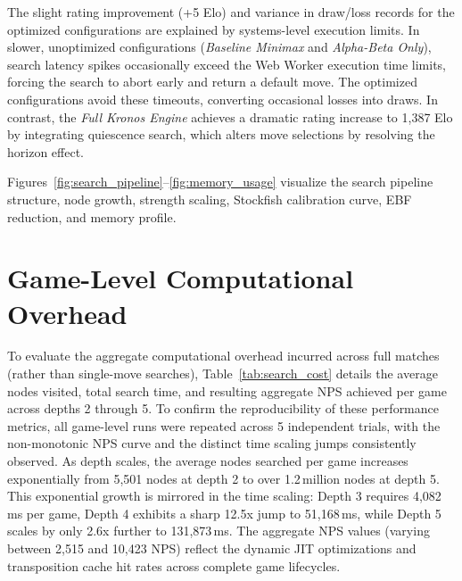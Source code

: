 The slight rating improvement (+5 Elo) and variance in draw/loss records for the optimized configurations are explained by systems-level execution limits. In slower, unoptimized configurations (\textit{Baseline Minimax} and \textit{Alpha-Beta Only}), search latency spikes occasionally exceed the Web Worker execution time limits, forcing the search to abort early and return a default move. The optimized configurations avoid these timeouts, converting occasional losses into draws. In contrast, the \textit{Full Kronos Engine} achieves a dramatic rating increase to 1,387 Elo by integrating quiescence search, which alters move selections by resolving the horizon effect.

Figures~\ref{fig:search_pipeline}--\ref{fig:memory_usage} visualize the search pipeline structure, node growth, strength scaling, Stockfish calibration curve, EBF reduction, and memory profile.









\section{Game-Level Computational Overhead}
To evaluate the aggregate computational overhead incurred across full matches (rather than single-move searches), Table~\ref{tab:search_cost} details the average nodes visited, total search time, and resulting aggregate NPS achieved per game across depths 2 through 5. To confirm the reproducibility of these performance metrics, all game-level runs were repeated across 5 independent trials, with the non-monotonic NPS curve and the distinct time scaling jumps consistently observed. As depth scales, the average nodes searched per game increases exponentially from 5,501 nodes at depth 2 to over 1.2\,million nodes at depth 5. This exponential growth is mirrored in the time scaling: Depth 3 requires 4,082\,ms per game, Depth 4 exhibits a sharp 12.5x jump to 51,168\,ms, while Depth 5 scales by only 2.6x further to 131,873\,ms. The aggregate NPS values (varying between 2,515 and 10,423 NPS) reflect the dynamic JIT optimizations and transposition cache hit rates across complete game lifecycles.

